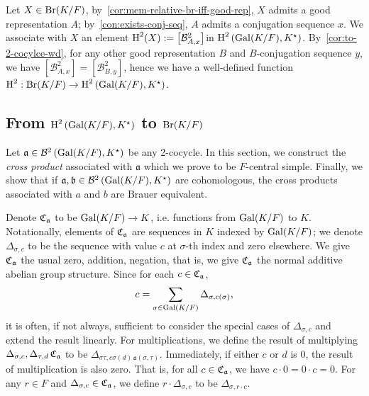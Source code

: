 \begin{construction}\label{con:br-to-snd-coh}
  Let $X \in \operatorname{Br}(K/F)$, by~\cref{cor:mem-relative-br-iff-good-rep}, $X$ admits a good representation $A$; by~\cref{con:exists-conj-seq}, $A$ admits a conjugation sequence $x$. We associate with $X$ an element $\operatorname{H}^{2}(X) := \left[\mathcal{B}^{2}_{A,x}\right]$in $\operatorname{H}^{2}\left(\operatorname{Gal}(K/F),K^{\star}\right)$. By~\cref{cor:to-2-cocylce-wd}, for any other good representation $B$ and $B$-conjugation sequence $y$, we have $\left[\mathcal{B}^{2}_{A,x}\right]=\left[\mathcal{B}^{2}_{B,y}\right]$, hence we have a well-defined function $\operatorname{H}^{2} : \operatorname{Br}(K/F) \to \operatorname{H}^{2}\left(\operatorname{Gal}(K/F),K^{\star}\right)$.
  \leanok
\end{construction}

\subsection{From $\operatorname{H}^{2}\left(\operatorname{Gal}(K/F), K^{\star}\right)$ to $\operatorname{Br}(K/F)$}

Let $\mathfrak{a} \in \mathcal{B}^{2}\left(\operatorname{Gal}(K/F), K^{\star}\right)$ be any 2-cocycle. In this section, we construct the {\em cross product\/} associated with $\mathfrak{a}$ which we prove to be $F$-central simple. Finally, we show that if $\mathfrak{a}, \mathfrak{b}\in\mathcal{B}^{2}\left(\operatorname{Gal}(K/F), K^{\star}\right)$ are cohomologous, the cross products associated with $a$ and $b$ are Brauer equivalent.

\begin{construction}\label{con:cross-product}
  Denote $\operatorname{\mathfrak{C}}_{\mathfrak{a}}$ to be $\operatorname{Gal}(K/F) \to K$, i.e. functions from $\operatorname{Gal}(K/F)$ to $K$. Notationally, elements of $\operatorname{\mathfrak{C}}_{\mathfrak{a}}$ are sequences in $K$ indexed by $\operatorname{Gal}(K/F)$; we denote $\Delta_{\sigma, c}$ to be the sequence with value $c$ at $\sigma$-th index and zero elsewhere. We give $\operatorname{\mathfrak{C}}_{\mathfrak{a}}$ the usual zero, addition, negation, that is, we give $\operatorname{\mathfrak{C}}_{\mathfrak{a}}$ the normal additive abelian group structure. Since for each $c \in \operatorname{\mathfrak{C}}_{\mathfrak{a}}$,
  \[
    c = \sum_{\sigma\in\operatorname{Gal}(K/F)}\Delta_{\sigma, c(\sigma)},
    \]
    it is often, if not always, sufficient to consider the special cases of $\Delta_{\sigma, c}$ and extend the result linearly.
  For multiplications, we define the result of multiplying $\Delta_{\sigma, c},\Delta_{\tau, d} \operatorname{\mathfrak{C}}_{\mathfrak{a}}$ to be $\Delta_{\sigma\tau, c\sigma(d)\, \mathfrak{a}(\sigma,\tau)}$. Immediately, if either $c$ or $d$ is $0$, the result of multiplication is also zero. That is, for all $c \in \operatorname{\mathfrak{C}}_{\mathfrak{a}}$, we have $c\cdot 0=0\cdot c =0$. For any $r \in F$ and $\Delta_{\sigma, c} \in \operatorname{\mathfrak{C}}_{\mathfrak{a}}$, we define $r \cdot \Delta_{\sigma, c}$ to be $\Delta_{\sigma, r\cdot c}$.
  \leanok
\end{construction}

